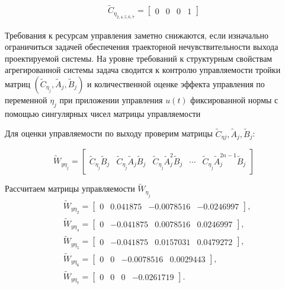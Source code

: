 \begin{align*}
\tilde{C}_{\eta_{2,4,5,6,7}}=
\begin{bmatrix}
0&0&0&1
\end{bmatrix}
\end{align*}

Требования к ресурсам управления заметно снижаются, если изначально ограничиться задачей обеспечения траекторной нечувствительности выхода проектируемой системы. На уровне требований к структурным свойствам агрегированной системы задача сводится к контролю управляемости тройки матриц $(\tilde{C}_{\eta_j}, \tilde{A}_{j}, \tilde{B}_{j})$ и количественной оценке эффекта управления по переменной $\eta_j$ при приложении управления $u(t)$ фиксированной нормы с помощью сингулярных чисел матрицы управляемости

Для оценки управляемости по выходу проверим матрицы $ \tilde{C}_{\eta j},\tilde{A}_j,\tilde{B}_j $:

\begin{equation}
	\tilde{W}_{y \eta_j} =
	\begin{bmatrix}
		\tilde{C}_{\eta_j} \tilde{B}_{j} &
		\tilde{C}_{\eta_j} \tilde{A}_{j} \tilde{B}_{j} &
		\tilde{C}_{\eta_j} \tilde{A}_{j}^2 \tilde{B}_{j} &		
		\cdots &
		\tilde{C}_{\eta_j} \tilde{A}_{j}^{2n-1} \tilde{B}_{j}
	\end{bmatrix}
\end{equation}

Рассчитаем матрицы управляемости $\tilde{W}_{\eta_j}$
\begin{align*}
	&\tilde{W}_{y \eta_2} =
	\begin{bmatrix}
		0 &  0.041875 &   −0.0078516& −0.0246997  	
	\end{bmatrix}, 
	\\
	&\tilde{W}_{y \eta_4} =
	\begin{bmatrix}
		0   &   −0.041875 & 0.0078516 &   0.0246997  
	\end{bmatrix}, 
	\\
	&\tilde{W}_{y \eta_5} =
	\begin{bmatrix}
		0 & −0.041875    &    0.0157031 & 0.0479272 
	\end{bmatrix}, 
	\\
	&\tilde{W}_{y \eta_6} =
	\begin{bmatrix}
		0   &   0   &   −0.0078516  &  0.0029443 
	\end{bmatrix}, 
	\\
	&\tilde{W}_{y \eta_7} =
	\begin{bmatrix}
		0 & 0 &   0 & −0.0261719
	\end{bmatrix}.
\end{align*}

